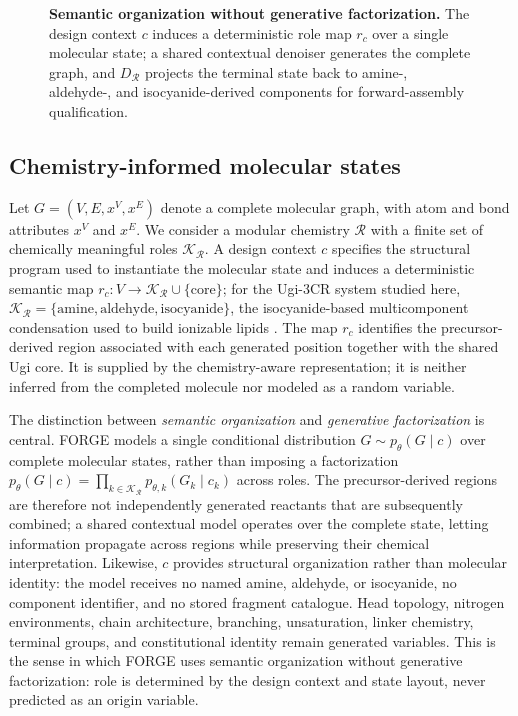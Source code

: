 \documentclass{article}
\newcommand{\FIGBOX}[1]{%
  \fbox{\begin{minipage}[c][#1][c]{\dimexpr\textwidth-2\fboxsep-2\fboxrule\relax}%
  \centering\textbf{[FIGURE IN PROGRESS]}%
  \end{minipage}}}
\newcommand{\rolemap}{\ensuremath{r_c}}
\newcommand{\decomp}{\ensuremath{D_{\mathcal{R}}}}
\begin{document}
\begin{figure}[H]
\centering
\FIGBOX{1.9in}
\caption{\textbf{Semantic organization without generative factorization.} The design context $c$
induces a deterministic role map \rolemap{} over a single molecular state; a shared contextual
denoiser generates the complete graph, and \decomp{} projects the terminal state back to
amine-, aldehyde-, and isocyanide-derived components for forward-assembly qualification.
}
\label{fig:concept}
\end{figure}

\subsection{Chemistry-informed molecular states}
\label{sec:states}
Let $G = (V, E, x^V, x^E)$ denote a complete molecular graph, with atom and bond attributes $x^V$ and
$x^E$. We consider a modular chemistry $\mathcal{R}$ with a finite set of chemically meaningful roles
$\mathcal{K}_{\mathcal{R}}$. A design context $c$ specifies the structural program used to instantiate
the molecular state and induces a deterministic semantic map
$r_c : V \rightarrow \mathcal{K}_{\mathcal{R}} \cup \{\mathrm{core}\}$; for the Ugi-3CR system studied
here, $\mathcal{K}_{\mathcal{R}} = \{\mathrm{amine}, \mathrm{aldehyde}, \mathrm{isocyanide}\}$, the
isocyanide-based multicomponent condensation
\citep{domling2000multicomponent,domling2006isocyanide} used to build ionizable lipids
\citep{wang2025ugi,vlasova2025synthesis}. The map
\rolemap{} identifies the precursor-derived region associated with each generated position together
with the shared Ugi core. It is supplied by the chemistry-aware representation; it is neither inferred
from the completed molecule nor modeled as a random variable.

The distinction between \emph{semantic organization} and \emph{generative factorization} is central.
FORGE models a single conditional distribution $G \sim p_\theta(G \mid c)$ over complete molecular
states, rather than imposing a factorization
$p_\theta(G \mid c) = \prod_{k \in \mathcal{K}_{\mathcal{R}}} p_{\theta,k}(G_k \mid c_k)$ across roles.
The precursor-derived regions are therefore not independently generated reactants that are
subsequently combined; a shared contextual model operates over the complete state, letting
information propagate across regions while preserving their chemical interpretation. Likewise, $c$
provides structural organization rather than molecular identity: the model receives no named amine,
aldehyde, or isocyanide, no component identifier, and no stored fragment catalogue. Head topology,
nitrogen environments, chain architecture, branching, unsaturation, linker chemistry, terminal
groups, and constitutional identity remain generated variables. This is the sense in which FORGE uses
semantic organization without generative factorization: role is determined by the design
context and state layout, never predicted as an origin variable.
\end{document}

